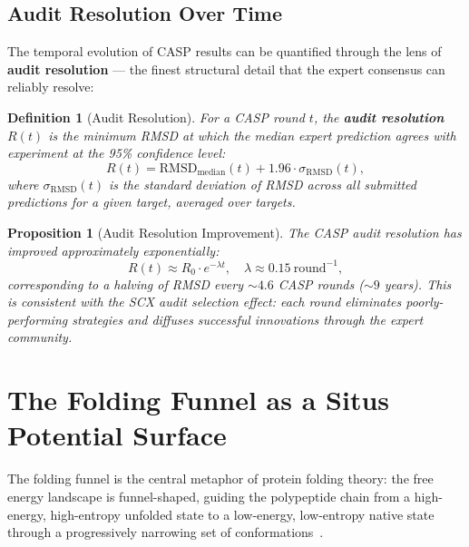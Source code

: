 \documentclass[12pt,a4paper]{article}
\newtheorem{proposition}[theorem]{Proposition}
\newtheorem{definition}[theorem]{Definition}
\theoremstyle{remark}
\begin{document}
\subsection{Audit Resolution Over Time}

The temporal evolution of CASP results can be quantified through the lens of \textbf{audit resolution} — the finest structural detail that the expert consensus can reliably resolve:

\begin{definition}[Audit Resolution]
For a CASP round $t$, the \textbf{audit resolution} $R(t)$ is the minimum RMSD at which the median expert prediction agrees with experiment at the 95\% confidence level:
\begin{equation}
    R(t) = \text{RMSD}_{\text{median}}(t) + 1.96 \cdot \sigma_{\text{RMSD}}(t),
\end{equation}
where $\sigma_{\text{RMSD}}(t)$ is the standard deviation of RMSD across all submitted predictions for a given target, averaged over targets.
\end{definition}

\begin{proposition}[Audit Resolution Improvement]
\label{prop:casp-resolution}
The CASP audit resolution has improved approximately exponentially:
\begin{equation}
    R(t) \approx R_0 \cdot e^{-\lambda t}, \quad \lambda \approx 0.15\ \text{round}^{-1},
\end{equation}
corresponding to a halving of RMSD every $\sim 4.6$ CASP rounds ($\sim 9$ years).
This is consistent with the SCX audit selection effect: each round eliminates poorly-performing strategies and diffuses successful innovations through the expert community.
\end{proposition}

\section{The Folding Funnel as a Situs Potential Surface}
\label{sec:funnel}

The folding funnel is the central metaphor of protein folding theory: the free energy landscape is funnel-shaped, guiding the polypeptide chain from a high-energy, high-entropy unfolded state to a low-energy, low-entropy native state through a progressively narrowing set of conformations~\cite{bryngelson1995funnels, wolynes2012energy, dill2008protein}.
\end{document}
